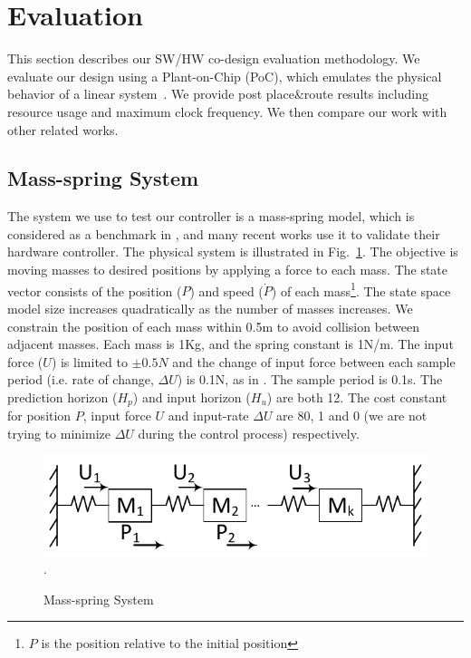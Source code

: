 \section{Evaluation}\label{eva}
This section describes our SW/HW co-design evaluation methodology. We evaluate our design using a Plant-on-Chip (PoC), which emulates the physical behavior of a linear system~\cite{VyaKum13A}. We provide post place\&route results including resource usage and maximum clock frequency. We then compare our work with other related works.
\subsection{Mass-spring System}
The system we use to test our controller is a mass-spring model, which is considered as a benchmark in \cite{6927473}, \cite{Jerez:2011:FIS:1950413.1950454} and many recent works use it to validate their hardware controller. The physical system is illustrated in Fig.~\ref{fig_ms}. The objective is moving masses to desired positions by applying a force to each mass. The state vector consists of the position ($P$) and speed ($\dot P$) of each mass\footnote{$P$ is the position relative to the initial position}. The state space model size increases quadratically as the number of masses increases. We constrain the position of each mass within 0.5m to avoid collision between adjacent masses. Each mass is 1Kg, and the spring constant is 1N/m. The input force ($U$) is limited to $\pm 0.5N$ and the change of input force between each sample period (i.e. rate of change, $\Delta U$) is 0.1N, as in \cite{jerez2014embedded}. The sample period is 0.1s. The prediction horizon ($H_p$) and input horizon ($H_u$) are both 12. The cost constant for position $P$, input force $U$ and input-rate $\Delta U$ are 80, 1 and 0 (we are not trying to minimize $\Delta U$ during the control process) respectively.

\begin{figure}[t]
\centering
\captionsetup{justification=centering}
\includegraphics[scale=.48]{../figure/massspring.pdf}
\DeclareGraphicsExtensions.
\caption{Mass-spring System\label{fig_ms}}
\end{figure}

